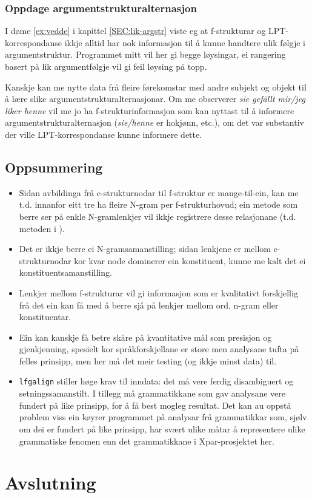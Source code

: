 \documentclass[11pt,a4paper,oneside,draft]{book}
\begin{document}
\subsection{Oppdage argumentstrukturalternasjon}
\label{sec-5.5.1}

 I døme \ref{ex:vedde} i kapittel \ref{SEC:lik-argstr} viste eg at
 f-strukturar og LPT-korrespondanse ikkje alltid har nok informasjon
 til å kunne handtere ulik følgje i argumentstruktur. Programmet mitt
 vil her gi begge løysingar, ei rangering basert på lik argumentfølgje
 vil gi feil løysing på topp.

 Kanskje kan me nytte data frå fleire førekomstar med andre subjekt og
 objekt til å lære slike argumentstrukturalternasjonar.  Om me
 observerer \emph{sie gefällt mir/jeg liker henne} vil me jo ha
 f-strukturinformasjon som kan nyttast til å informere
 argumentstrukturalternasjon (\emph{sie/henne} er hokjønn, etc.), om det
 var substantiv der ville LPT-korrespondanse kunne informere dette.
\section{Oppsummering}
\label{sec-5.6}

\begin{itemize}
\item Sidan avbildinga frå c-strukturnodar til f-struktur er
   mange-til-ein, kan me t.d. innanfor eitt tre ha fleire N-gram per
   f-strukturhovud; ein metode som berre ser på enkle N-gramlenkjer
   vil ikkje registrere desse relasjonane (t.d. metoden i
   \citet{samuelsson2007apa}).
\item Det er ikkje berre ei N-gramsamanstilling; sidan
   lenkjene er mellom c-strukturnodar kor kvar node dominerer ein
   konstituent, kunne me kalt det ei konstituentsamanstilling.
\item Lenkjer mellom f-strukturar vil gi informasjon som er kvalitativt
   forskjellig frå det ein kan få med å berre sjå på lenkjer mellom
   ord, n-gram eller konstituentar.
\item Ein kan kanskje få betre skåre på kvantitative mål som presisjon og
   gjenkjenning, spesielt kor språkforskjellane er store men analysane
   tufta på felles prinsipp, men her må det meir testing (og ikkje
   minst data) til.
\item \texttt{lfgalign} stiller høge krav til inndata: det må vere ferdig
   disambiguert og setningssamanstilt. I tillegg må grammatikkane som
   gav analysane vere fundert på like prinsipp, for å få best mogleg
   resultat. Det kan au oppstå problem viss ein køyrer programmet på
   analysar frå grammatikkar som, sjølv om dei er fundert på like
   prinsipp, har svært ulike måtar å representere ulike grammatiske
   fenomen enn det grammatikkane i Xpar-prosjektet her.
\end{itemize}
\chapter{Avslutning}
\label{sec-6}




\end{document}

